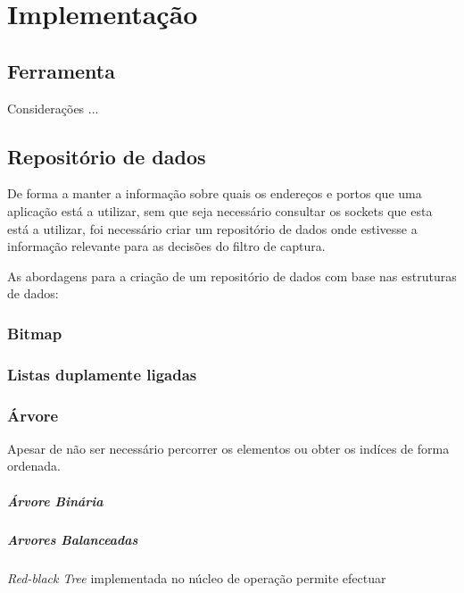 \chapter{Implementação}
\label{cap:Implementacao}



\section{Ferramenta}
Considerações ...

\section{Repositório de dados}

De forma a manter a informação sobre quais os endereços e portos que uma aplicação está a utilizar, sem que seja necessário consultar os sockets que esta está a utilizar, foi necessário criar um repositório de dados onde estivesse a informação relevante para as decisões do filtro de captura.

As abordagens para a criação de um repositório de dados com base nas estruturas de dados:

\subsection{Bitmap}

\subsection{Listas duplamente ligadas}

\subsection{Árvore}
Apesar de não ser necessário percorrer os elementos ou obter os indíces de forma ordenada. 

\paragraph{Árvore Binária}


\paragraph{Arvores Balanceadas}
\textit{Red-black Tree} implementada no núcleo de operação permite efectuar

